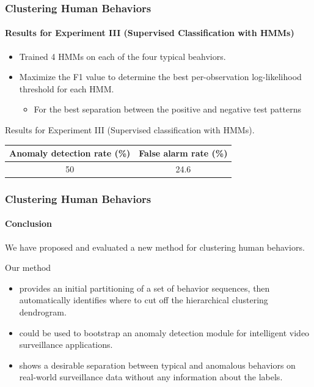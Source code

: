 \begin{frame}
    \frametitle{Clustering Human Behaviors}
    \framesubtitle{Results for Experiment III (Supervised 
        Classification with HMMs)}

    \begin{itemize}
        \item Trained 4 HMMs on each of the four typical beahviors.
        \item Maximize the F1 value to determine the best per-observation 
            log-likelihood threshold for each HMM.
            \begin{itemize}
                \item For the best separation between the positive and 
                    negative test patterns
            \end{itemize}
    \end{itemize}

    \medskip
    
    \centering Results for Experiment III (Supervised classification with HMMs).
    
    \begin{table}
        \label{tab:hmm-supervised-classification}
        \vspace{-0.1in}
        \centering
        \begin{tabular}{ | c | c | }
            \hline
            Anomaly detection rate (\%) & False alarm rate (\%) \\ \hline
            50 & 24.6 \\ \hline
        \end{tabular}
    \end{table}

\end{frame}


\begin{frame}
    \frametitle{Clustering Human Behaviors}
    \framesubtitle{Conclusion}
    
    We have proposed and evaluated a new method for 
    clustering human behaviors.

    \medskip

    Our method
    \begin{itemize}
        \item provides an initial partitioning of a set 
            of behavior sequences, then automatically 
            identifies where to cut off the hierarchical 
            clustering dendrogram.
        \item could be used to bootstrap an anomaly 
            detection module for intelligent video surveillance 
            applications.
        \item shows a desirable separation between typical and 
            anomalous behaviors on real-world surveillance data 
            \alert{without} any information about the labels.
    \end{itemize}

\end{frame}

